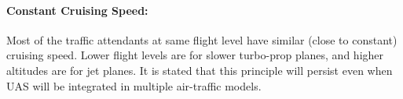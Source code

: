 \paragraph{Constant Cruising Speed:} Most of the traffic attendants at same flight level have similar (close to constant) cruising speed. Lower flight levels are for slower turbo-prop planes, and higher altitudes are for jet planes. It is stated that this principle will persist even when UAS will be integrated \cite{bayen2005langrangian,kopardekar2002dynamic,helme1992optimization} in multiple air-traffic models.


